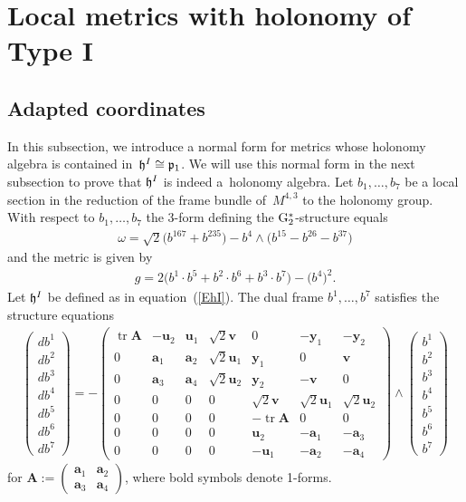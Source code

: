 \documentclass[pdftex]{sigma}
\numberwithin{equation}{section}
\newcommand\fh{{\frak h}}
\newcommand\fp{{\frak p}}
\newcommand\ba{{\mathbf a}}
\newcommand\bA{{\mathbf A}}
\newcommand\bu{{\mathbf u}}
\newcommand\by{{\mathbf y}}
\newcommand\bv{{\mathbf v}}
\newcommand{\G}{\mathop{{{\rm G}_{2}^*}}}
\newcommand{\tr}{\operatorname{tr}}
\begin{document}
\section{Local metrics with holonomy of Type I} \label{S2}
\subsection{Adapted coordinates}
In this subsection, we introduce a normal form for metrics whose holonomy algebra is contained in~$\fh^I\cong\fp_1$. We will use this normal form in the next subsection to prove that $\fh^I$ is indeed a~holonomy algebra. Let $b_1,\dots,b_7$ be a local section in the reduction of the frame bundle of~$M^{4,3}$ to the holonomy group. With respect to $b_1,\dots,b_7$ the 3-form defining the $\G$-structure equals
\begin{gather*}
\omega=\sqrt 2\big(b^{167}+b^{235}\big)-b^4\wedge \big(b^{15}-b^{26}-b^{37}\big)
\end{gather*}
and the metric is given by
\begin{gather}
g=2\big(b^1\cdot b^5+b^2\cdot b^6+b^3\cdot b^7\big)- \big(b^4\big)^2. \label{Eip}
\end{gather}
Let $\fh^I$ be defined as in equation~(\ref{EhI}). The dual frame $b^1,\dots,b^7$ satisfies the structure equations
\begin{gather}\label{Ese}
\left(\begin{matrix} db^1\\db^2\\db^3\\db^4\\db^5\\db^6\\db^7\end{matrix}\right) = -\left(
\begin{matrix}
\tr \bA &-\bu_2&\bu_1&\sqrt 2 \bv&0&-\by_1&-\by_2\\
0&\ba_1&\ba_2&\sqrt 2 \bu_1&\by_1&0&\bv\\
0&\ba_3&\ba_4&\sqrt 2 \bu_2&\by_2&-\bv&0\\
0&0&0&0&\sqrt 2 \bv&\sqrt 2 \bu_1&\sqrt 2 \bu_2\\
0&0&0&0&-\tr \bA&0&0\\
0&0&0&0&\bu_2&-\ba_1&-\ba_3\\
0&0&0&0&-\bu_1&-\ba_2&-\ba_4
	\end{matrix}\right) \wedge \left(\begin{matrix} b^1\\b^2\\b^3\\b^4\\b^5\\b^6\\b^7\end{matrix}\right)
\end{gather}	
for	$ \bA:=\left(\begin{smallmatrix} \ba_1&\ba_2\\ \ba_3&\ba_4\end{smallmatrix}\right)$, where bold symbols denote 1-forms.
\end{document}
